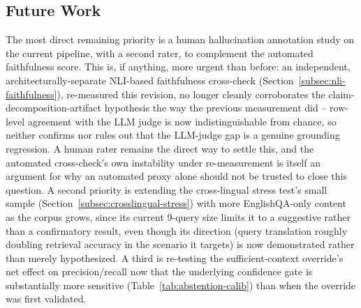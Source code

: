 \documentclass[a4paper,twoside]{article}
\begin{document}
\subsection{Future Work}

The most direct remaining priority is a human hallucination annotation study on the current pipeline, with a second rater, to complement the automated faithfulness score. This is, if anything, more urgent than before: an independent, architecturally-separate NLI-based faithfulness cross-check (Section~\ref{subsec:nli-faithfulness}), re-measured this revision, no longer cleanly corroborates the claim-decomposition-artifact hypothesis the way the previous measurement did -- row-level agreement with the LLM judge is now indistinguishable from chance, so neither confirms nor rules out that the LLM-judge gap is a genuine grounding regression. A human rater remains the direct way to settle this, and the automated cross-check's own instability under re-measurement is itself an argument for why an automated proxy alone should not be trusted to close this question. A second priority is extending the cross-lingual stress test's small sample (Section~\ref{subsec:crosslingual-stress}) with more EnglishQA-only content as the corpus grows, since its current 9-query size limits it to a suggestive rather than a confirmatory result, even though its direction (query translation roughly doubling retrieval accuracy in the scenario it targets) is now demonstrated rather than merely hypothesized. A third is re-testing the sufficient-context override's net effect on precision/recall now that the underlying confidence gate is substantially more sensitive (Table~\ref{tab:abstention-calib}) than when the override was first validated.
\end{document}
